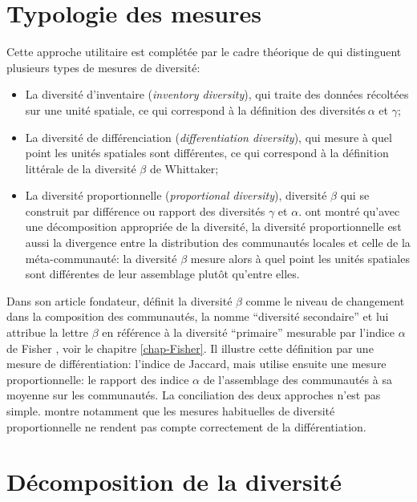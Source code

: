 \documentclass[
  11pt,
  french,
  a4paper,
  extrafontsizes,onecolumn,openright
  ]{memoir}
\providecommand{\tightlist}{%
  \setlength{\itemsep}{0pt}\setlength{\parskip}{0pt}}
\begin{document}
\hypertarget{sec-betaTypo}{%
\section{Typologie des mesures}\label{sec-betaTypo}}

Cette approche utilitaire est complétée par le cadre théorique de \textcite{Jurasinski2009} qui distinguent plusieurs types de mesures de diversité:

\begin{itemize}
\tightlist
\item
  La diversité d'inventaire (\emph{inventory diversity}), qui traite des données récoltées sur une unité spatiale, ce qui correspond à la définition des diversités\(\ \alpha\) et \(\gamma\);
\item
  La diversité de différenciation (\emph{differentiation diversity}), qui mesure à quel point les unités spatiales sont différentes, ce qui correspond à la définition littérale de la diversité \(\beta\) de Whittaker;
\item
  La diversité proportionnelle (\emph{proportional diversity}), diversité \(\beta\) qui se construit par différence ou rapport des diversités \(\gamma\) et \(\alpha\). \textcite{Marcon2014a} ont montré qu'avec une décomposition appropriée de la diversité, la diversité proportionnelle est aussi la divergence entre la distribution des communautés locales et celle de la méta-communauté: la diversité \(\beta\) mesure alors à quel point les unités spatiales sont différentes de leur assemblage plutôt qu'entre elles.
\end{itemize}

Dans son article fondateur, \textcite{Whittaker1960} définit la diversité \(\beta\) comme le niveau de changement dans la composition des communautés, la nomme \enquote{diversité secondaire} et lui attribue la lettre \(\beta\) en référence à la diversité \enquote{primaire} mesurable par l'indice \(\alpha\) de Fisher \autocite{Fisher1943}, voir le chapitre \ref{chap-Fisher}.
Il illustre cette définition par une mesure de différentiation: l'indice de Jaccard, mais utilise ensuite une mesure proportionnelle: le rapport des indice \(\alpha\) de l'assemblage des communautés à sa moyenne sur les communautés.
La conciliation des deux approches n'est pas simple.
\textcite{Gregorius2016} montre notamment que les mesures habituelles de diversité proportionnelle ne rendent pas compte correctement de la différentiation.

\hypertarget{sec-betaDecomposition}{%
\section{Décomposition de la diversité}\label{sec-betaDecomposition}}
\end{document}
